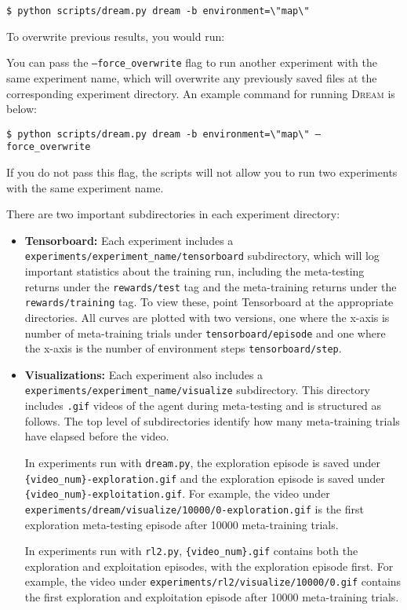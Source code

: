 \documentclass[12pt]{article}
\newcommand{\dream}{\textsc{Dream }}
\begin{document}
\texttt{\$ python scripts/dream.py dream -b environment=\textbackslash"map\textbackslash"}

To overwrite previous results, you would run: 

You can pass the \texttt{--force\_overwrite} flag to run another experiment with the same experiment name, which will overwrite any previously saved files at the corresponding experiment directory. An example command for running \dream is below:

\texttt{\$ python scripts/dream.py dream -b environment=\textbackslash"map\textbackslash" --force\_overwrite}

If you do not pass this flag, the scripts will not allow you to run two experiments with the same experiment name.

There are two important subdirectories in each experiment directory:
\begin{itemize}
    \item \textbf{Tensorboard:} Each experiment includes a \texttt{experiments/experiment\_name/tensorboard} subdirectory, which will log important statistics about the training run, including the meta-testing returns under the \texttt{rewards/test} tag and the meta-training returns under the \texttt{rewards/training} tag. To view these, point Tensorboard at the appropriate directories. All curves are plotted with two versions, one where the x-axis is number of meta-training trials under \texttt{tensorboard/episode} and one where the x-axis is the number of environment steps \texttt{tensorboard/step}.
    \item \textbf{Visualizations:} Each experiment also includes a \texttt{experiments/experiment\_name/visualize} subdirectory. This directory includes \texttt{.gif} videos of the agent during meta-testing and is structured as follows.
    The top level of subdirectories identify how many meta-training trials have elapsed before the video.
    
    In experiments run with \texttt{dream.py}, the exploration episode is saved under \linebreak
    \texttt{\{video\_num\}-exploration.gif} and the exploration episode is saved under \linebreak \texttt{\{video\_num\}-exploitation.gif}.
    For example, the video under \linebreak
    \texttt{experiments/dream/visualize/10000/0-exploration.gif} is the first exploration meta-testing episode after 10000 meta-training trials.
    
    In experiments run with \texttt{rl2.py}, \texttt{\{video\_num\}.gif} contains both the exploration and exploitation episodes, with the exploration episode first.
    For example, the video under \texttt{experiments/rl2/visualize/10000/0.gif} contains the first exploration and exploitation episode after 10000 meta-training trials.
\end{itemize}
\end{document}
